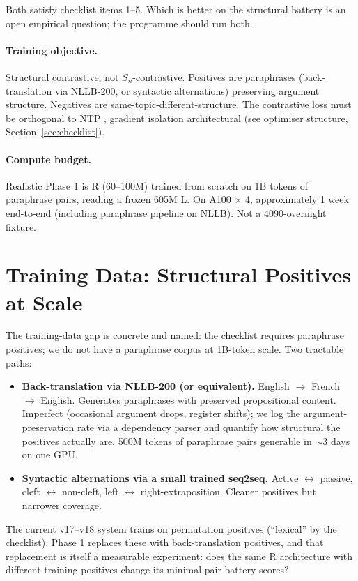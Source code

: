 \documentclass[10pt, twocolumn, a4paper]{article}
\newcommand{\Sn}{S_n}
\begin{document}
Both satisfy checklist items 1--5. Which is better on the structural battery is an open empirical question; the programme should run both.

\paragraph{Training objective.} Structural contrastive, not $\Sn$-contrastive. Positives are paraphrases (back-translation via NLLB-200, or syntactic alternations) preserving argument structure. Negatives are same-topic-different-structure. The contrastive loss must be orthogonal to NTP ,  gradient isolation architectural (see optimiser structure, Section~\ref{sec:checklist}).

\paragraph{Compute budget.} Realistic Phase 1 is R (60--100M) trained from scratch on 1B tokens of paraphrase pairs, reading a frozen 605M L. On A100 $\times$ 4, approximately 1 week end-to-end (including paraphrase pipeline on NLLB). Not a 4090-overnight fixture.

\section{Training Data: Structural Positives at Scale}

The training-data gap is concrete and named: the checklist requires paraphrase positives; we do not have a paraphrase corpus at 1B-token scale. Two tractable paths:

\begin{itemize}[nosep,leftmargin=*]
\item \textbf{Back-translation via NLLB-200 (or equivalent).} English $\to$ French $\to$ English. Generates paraphrases with preserved propositional content. Imperfect (occasional argument drops, register shifts); we log the argument-preservation rate via a dependency parser and quantify how structural the positives actually are. 500M tokens of paraphrase pairs generable in $\sim$3 days on one GPU.
\item \textbf{Syntactic alternations via a small trained seq2seq.} Active $\leftrightarrow$ passive, cleft $\leftrightarrow$ non-cleft, left $\leftrightarrow$ right-extraposition. Cleaner positives but narrower coverage.
\end{itemize}

The current v17--v18 system trains on permutation positives (``lexical'' by the checklist). Phase 1 replaces these with back-translation positives, and that replacement is itself a measurable experiment: does the same R architecture with different training positives change its minimal-pair-battery scores?
\end{document}
